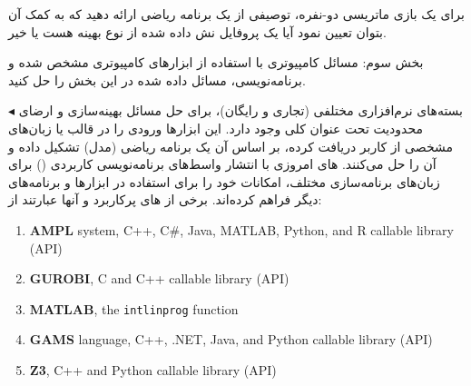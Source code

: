 \documentclass[12pt]{exam}
\theoremstyle{plain}
\theoremstyle{definition}
\theoremstyle{remark}
\begin{document}
\begin{questions}
\question
برای یک بازی ماتریسی دو-نفره، توصیفی از یک برنامه ریاضی ارائه دهید که به کمک آن بتوان تعیین نمود آیا یک پروفایل نش داده شده از نوع بهینه
  هست یا خیر.



\newpage
\begin{mybox2}{بخش سوم: مسائل کامپیوتری}
	با استفاده از ابزارهای کامپیوتری مشخص شده و برنامه‌نویسی، مسائل داده شده در این بخش را حل کنید. 
\end{mybox2}

\begin{mybox3}{}

$ \blacktriangleleft$
 بسته‌های نرم‌افزاری مختلفی (تجاری و رایگان)، برای حل مسائل بهینه‌سازی و ارضای محدودیت تحت عنوان کلی 
وجود دارد. این ابزار‌ها ورودی را در قالب یا زبان‌‌های مشخصی از کاربر دریافت کرده، بر اساس آن یک برنامه ریاضی (مدل) تشکیل داده و آن را حل می‌کنند.  
های
امروزی با انتشار واسط‌های برنامه‌نویسی کاربردی 
()
برای زبان‌های برنامه‌سازی مختلف، امکانات خود را برای استفاده در ابزارها و برنامه‌های دیگر فراهم کرده‌اند. 
برخی از 
های
پرکاربرد و 
آنها عبارتند از:
 \begin{latin}
    \begin{enumerate}[label*=\arabic*.]
        \item{ 
            \textbf{AMPL} system, C++, C\#, Java, MATLAB, Python, and R callable library (API) 
        }
    
      \item{ 
        \textbf{GUROBI}, C and C++ callable library (API) 
    }

    \item{ 
        \textbf{MATLAB}, the \texttt{intlinprog} function 
    }

   \item{ 
    \textbf{GAMS} language, C++, .NET, Java, and Python callable library (API)
}

     \item{  
        \textbf{Z3}, C++ and Python callable library (API)
    }


\end{enumerate}
\end{latin}
\end{mybox3}
\end{questions}
\end{document}
